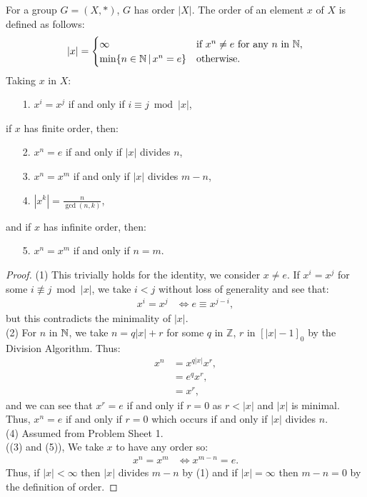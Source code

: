 For a group $G = (X, \ast)$, $G$ has order $|X|$. The order of an element $x$ of
$X$ is defined as follows: \begin{align*}
    |x| = \begin{cases}
        \infty & \text{if $x^n \neq e$ for any $n$ in $\mathbb{N}$}, \\
        \min\{n \in \mathbb{N} \, | \, x^n = e\} & \text{otherwise}. 
    \end{cases}
\end{align*} Taking $x$ in $X$: \begin{itemize}
    \item[1.] $x^i = x^j$ if and only if $i \equiv j \bmod |x|$,
\end{itemize} if $x$ has finite order, then: \begin{itemize}
    \item[2.] $x^n = e$ if and only if $|x|$ divides $n$,
    \item[3.] $x^n = x^m$ if and only if $|x|$ divides $m - n$,
    \item[4.] $|x^k| = \frac{n}{\gcd(n, k)}$,
\end{itemize} and if $x$ has infinite order, then: \begin{itemize}
    \item[5.] $x^n = x^m$ if and only if $n = m$.
\end{itemize} 

\begin{proof}
    (1) This trivially holds for the identity, we consider
    $x \neq e$. If $x^i = x^j$ for some $i \not\equiv j \bmod |x|$,
    we take $i < j$ without loss of generality and see that:
    \begin{align*}
        x^i = x^j 
        &\Longleftrightarrow e \equiv x^{j - i},
    \end{align*} but this contradicts the minimality of $|x|$.
    \\[\baselineskip]
    (2) For $n$ in $\mathbb{N}$, we take $n = q|x| + r$ for some $q$ 
    in $\mathbb{Z}$, $r$ in $[|x| - 1]_0$ by the 
    Division Algorithm. Thus: \begin{align*}
        x^n &= x^{q|x|}x^r, \\
        &= e^qx^r, \\
        &= x^r,
    \end{align*} and we can see that $x^r = e$ if and only if $r = 0$ as $r < |x|$
    and $|x|$ is minimal. Thus, $x^n = e$ if and only if $r = 0$ which occurs
    if and only if $|x|$ divides $n$.
    \\[\baselineskip]
    (4) Assumed from Problem Sheet 1.
    \\[\baselineskip]
    ((3) and (5)), We take $x$ to have any order so: \begin{align*}
        x^n = x^m &\Longleftrightarrow x^{m - n} = e.
    \end{align*} Thus, if $|x| < \infty$ then $|x|$ divides $m - n$ by (1) and
    if $|x| = \infty$ then $m - n = 0$ by the definition of order.
\end{proof}

